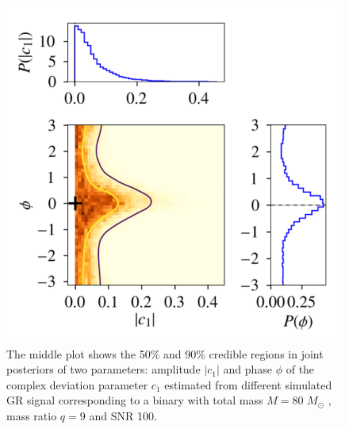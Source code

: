 \documentclass[prd,preprintnumbers,twocolumn,eqsecnum,floatfix,a4paper,nofootinbib,superscriptaddress]{revtex4}
\begin{document}
\begin{figure}[tbh]
    \begin{center}
    \includegraphics[scale=0.8]{figs/triangle_plot_M_80_q_9_snr_100_complex_c1.png}
    \end{center} 
    \caption{The middle plot shows the 50\% and 90\% credible regions in joint posteriors of two parameters: amplitude $|c_1|$ and phase $\phi$ of the complex deviation parameter $c_1$ estimated from different simulated GR signal corresponding to a binary with total mass $M=80$ $M_{\odot}$ , mass ratio $q=9$ and SNR 100.}
    \label{fig:c1_triangle}
\end{figure}
\end{document}
